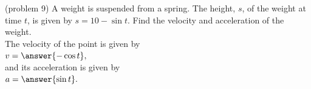 \documentclass[handout]{ximera}
\begin{document}
\begin{problem}(problem 9)
A weight is suspended from a spring.
The height, $s$, of the weight at time $t$, is given by $s = 10-\sin t$.  Find the velocity and acceleration of the weight.\\
The velocity of the point is given by\\
 $v = \answer{ -\cos t},$ \\
and its acceleration is given by\\
 $a = \answer{\sin t}.$
\end{problem}
\end{document}
